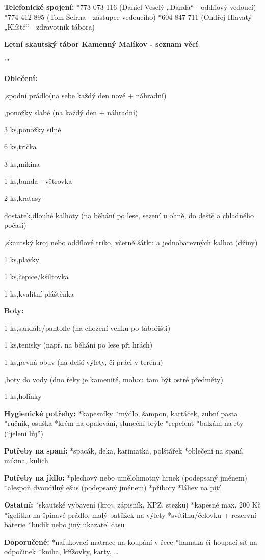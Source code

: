 {\bf Telefonické spojení:}
\begitems
*773 073 116 (Daniel Veselý „Danda“ - oddílový vedoucí)
*774 412 895 (Tom Šefrna - zástupce vedoucího)
*604 847 711 (Ondřej Hlavatý „Klíště“ - zdravotník tábora)
\enditems
\vfil\break

\centerline{\typosize[14/13]\bf Letní skautský tábor Kamenný Malíkov - seznam věcí}
\bigskip
{{ "\def\item#1,#2{\par\hbox{\hbox to 2cm{#1\hfil}#2\hfil}}" }}


{\bf Oblečení:}\smallskip
\item,{spodní prádlo(na sebe každý den nové + náhradní)}
\item,{ponožky slabé (na každý den + náhradní)}
\item{3 ks},{ponožky silné}
\item{6 ks},{trička}
\item{3 ks},{mikina}
\item{1 ks},{bunda - větrovka}
\item{2 ks},{kraťasy}
\item{dostatek},{dlouhé kalhoty (na běhání po lese, sezení u ohně, do deště a chladného počasí)}
\item{},{skautský kroj nebo oddílové triko, včetně šátku a jednobarevných kalhot (džíny)}
\item{1 ks},{plavky}
\item{1 ks},{čepice/kšiltovka}
\item{1 ks},{kvalitní pláštěnka}

\vskip 0.5cm
{\bf Boty:}\smallskip
\item{1 ks},{sandále/pantofle (na chození venku po tábořišti)}
\item{1 ks},{tenisky (např. na běhání po lese při hrách)}
\item{1 ks},{pevná obuv (na delší výlety, či práci v terénu)}
\item{},{boty do vody (dno řeky je kamenité, mohou tam být ostré předměty)}
\item{1 ks},{holínky}
\vskip 0.5cm

{\bf Hygienické potřeby:}\smallskip
\begitems
*kapesníky 
*mýdlo, šampon, kartáček, zubní pasta
*ručník, osuška
*krém na opalování, sluneční brýle
*repelent
*balzám na rty (“jelení lůj”)
\enditems

{\bf Potřeby na spaní:}\smallskip
\begitems
*spacák, deka, karimatka, polštářek
*oblečení na spaní, mikina, kulich
\enditems

{\bf Potřeby na jídlo:}\smallskip
\begitems
*plechový nebo umělohmotný hrnek (podepsaný jménem)
*alespoň dvoudílný ešus (podepsaný jménem)
*příbory
*láhev na pití
\enditems

{\bf Ostatní:}\smallskip
\begitems
*skautské vybavení (kroj, zápisník, KPZ, stezku)
*kapesné max. 200 Kč
*igelitka na špinavé prádlo, malý batůžek na výlety
*svítilnu/čelovku + rezervní baterie
*budík nebo jiný ukazatel času
\enditems

{\bf Doporučené:}\smallskip
\begitems
*nafukovací matrace na koupání v řece
*hamaka či houpací síť na odpočinek
*kniha, křížovky, karty, …
\enditems
\bye
